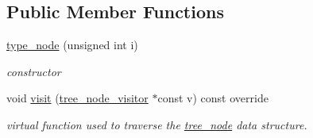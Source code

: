 \subsection*{Public Member Functions}
\begin{DoxyCompactItemize}
\item 
\hyperlink{structtype__node_a28d2f3a1e40857a2c5c5e34e4456e015}{type\+\_\+node} (unsigned int i)
\begin{DoxyCompactList}\small\item\em constructor \end{DoxyCompactList}\item 
void \hyperlink{structtype__node_adc6e447af5f9505e6305320933c46a96}{visit} (\hyperlink{classtree__node__visitor}{tree\+\_\+node\+\_\+visitor} $\ast$const v) const override
\begin{DoxyCompactList}\small\item\em virtual function used to traverse the \hyperlink{classtree__node}{tree\+\_\+node} data structure. \end{DoxyCompactList}\end{DoxyCompactItemize}
